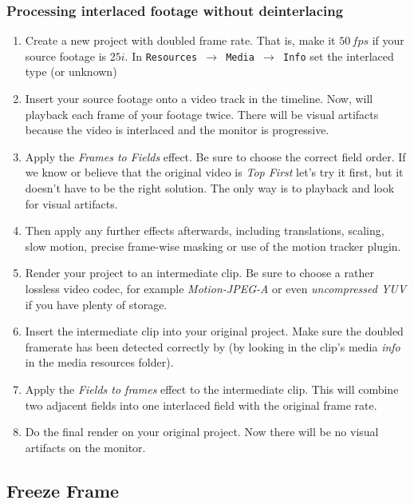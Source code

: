 \subsubsection*{Processing interlaced footage without deinterlacing}
\label{ssub:processing_interlace_footage}

\begin{enumerate}
    \item Create a new project with doubled frame rate. That is, make it $50\,fps$ if your source footage is $25i$.
    In \texttt{Resources $\rightarrow$ Media $\rightarrow$ Info} set the interlaced type (or unknown)
    \item Insert your source footage onto a video track in the timeline. Now, \CGG{} will playback each
    frame of your footage twice. There will be visual artifacts because the video is interlaced and the
    monitor is progressive.
    \item Apply the \textit{Frames to Fields} effect. Be sure to choose the correct field order. If we know or believe that the original video is \textit{Top First} let's try it first, but it doesn't have to be the right solution. The only way is to playback and look for visual artifacts.
    \item Then apply any further effects afterwards, including translations, scaling, slow motion, precise
    frame-wise masking or use of the motion tracker plugin.
    \item Render your project to an intermediate clip. Be sure to choose a rather lossless video codec, for
    example \textit{Motion-JPEG-A} or even \textit{uncompressed YUV} if you have plenty of storage.
    \item Insert the intermediate clip into your original project. Make sure the doubled framerate has been
    detected correctly by \CGG{} (by looking in the clip's media \textit{info} in the media resources folder).
    \item Apply the \textit{Fields to frames} effect to the intermediate clip. This will combine two adjacent fields
    into one interlaced field with the original frame rate.
    \item Do the final render on your original project. Now there will be no visual artifacts on the monitor.
\end{enumerate}

\subsection{Freeze Frame}%
\label{sub:freeze_frame}

